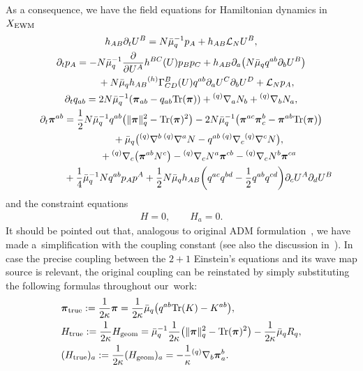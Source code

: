 \documentclass[pdftex]{sigma}
\def\ptl{\partial}%
\def\mbo#1{\boldsymbol{#1}}%
\def\grad{{\nabla}}%
\newcommand{\leftexp}[2]{{\vphantom{#2}}^{#1}{#2}}
\def\halb{\frac{1}{2}}%
\numberwithin{equation}{section}
\begin{document}
As a consequence, we have the field equations for Hamiltonian dynamics in $X_{{\rm EWM}}$
\begin{subequations}
\begin{gather}
h_{AB} \ptl_t U^B = N \bar{\mu}^{-1}_q p_A + h_{AB} \mathcal{L}_N U^B, \\
\ptl_t p_A= - N \bar{\mu}^{-1}_q\frac{\ptl}{\ptl U^A}h^{BC} (U) p_B p_C + h_{AB} \ptl_a\bigl(N \bar{\mu}_q q^{ab} \ptl_b U^B\bigr) \notag\\
 \hphantom{\ptl_t p_A=}{}
 + N \bar{\mu}_q h_{AB} \leftexp{(h)}{\Gamma}^B_{CD}(U)q^{ab}\ptl_a U^C \ptl_b U^D + \mathcal{L}_N p_A,\\
\ptl_t q_{ab} = 2 N \bar{\mu}^{-1}_q (\mbo{\pi}_{ab} - q_{ab} {\rm Tr} (\mbo{\pi})) + \leftexp{(q)}{\grad}_a N_b + \leftexp{(q)}{\grad}_b N_a, \label{qdot}\\
\ptl_t \mbo{\pi}^{ab}= \halb N \bar{\mu}^{-1}_q q^{ab} \bigl(\Vert \mbo{\pi} \Vert^2_q - {\rm Tr}(\mbo{\pi})^2\bigr)- 2N \bar{\mu}^{-1}_q \bigl( \mbo{\pi}^{ac} \mbo{\pi}^{b}_c - \mbo{\pi}^{ab} {\rm Tr}(\mbo{\pi}) \bigr) \notag\\
\hphantom{\ptl_t \mbo{\pi}^{ab}=}{}
 +\bar{\mu}_q \bigl(\leftexp{(q)}{\grad}^b \,\leftexp{(q)}{\grad}^a N -q^{ab}\, \leftexp{(q)}{\grad}_c \leftexp{(q)}{\grad}^c N\bigr), \notag\\
\hphantom{\ptl_t \mbo{\pi}^{ab}=}{}
 + \leftexp{(q)}{\grad}_c\bigl(\mbo{\pi}^{ab} N^c\bigr) - \leftexp{(q)}{\grad}_c N^a \mbo{\pi}^{cb} - \leftexp{(q)}{\grad}_c N^b \mbo{\pi}^{ca}\notag\\
\hphantom{\ptl_t \mbo{\pi}^{ab}=}{}
 + \frac{1}{4}\bar{\mu}_q^{-1}N q^{ab} p_A p^A + \halb N \bar{\mu}_q h_{AB} \biggl(q^{ac}q^{bd} - \halb q^{ab} q^{cd}\biggr)\ptl_c U^A \ptl_d U^B
\end{gather}
\end{subequations}
and the constraint equations
\begin{align}\label{constraints}
H=0, \qquad H_a =0.
\end{align}
It should be pointed out that, analogous to original ADM formulation~\cite{ADM_62}, we have made a~simplification with the coupling constant (see also the discussion in~\cite[pp.~520--521]{MTW}). In case the precise coupling between the $2 + 1$ Einstein's equations and its wave map source is relevant, the original coupling can be reinstated by simply substituting the following formulas throughout our~work:
\begin{align*}
&\mbo{\pi}_{{\rm true}} := \frac{1}{2\kappa} \mbo{\pi}= \frac{1}{2\kappa} \bar{\mu}_q \bigl(q^{ab} {\rm Tr}(K) - K^{ab} \bigr), \\
&H_{{\rm true}} := \frac{1}{2\kappa} H_{{\rm geom}} = \bar{\mu}^{-1}_q \frac{1}{2\kappa} \bigl(\Vert \mbo{\pi} \Vert_q^2 - {\rm Tr}(\mbo{\pi})^2 \bigr) - \frac{1}{2\kappa} \bar{\mu}_q R_q, \\
&(H_{{\rm true}})_a := \frac{1}{2 \kappa} (H_{{\rm geom}})_a = -\frac{1}{\kappa} \leftexp{(q)}{\grad}_b \mbo{\pi}^{b}_a.
\end{align*}
\end{document}

